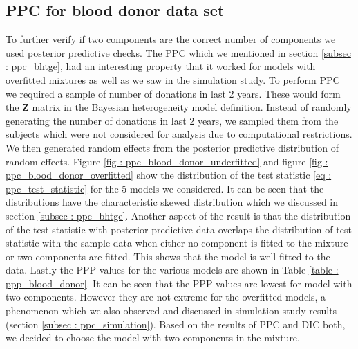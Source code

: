 \subsection{PPC for blood donor data set}
To further verify if two components are the correct number of components we used posterior predictive checks. The PPC which we mentioned in section \ref{subsec : ppc_bhtge}, had an interesting property that it worked for models with overfitted mixtures as well as we saw in the simulation study. To perform PPC we required a sample of number of donations in last 2 years. These would form the $\boldsymbol{Z}$ matrix in the Bayesian heterogeneity model definition. Instead of randomly generating the number of donations in last 2 years, we sampled them from the subjects which were not considered for analysis due to computational restrictions. We then generated random effects from the posterior predictive distribution of random effects. Figure \ref{fig : ppc_blood_donor_underfitted} and figure \ref{fig : ppc_blood_donor_overfitted} show the distribution of the test statistic \ref{eq : ppc_test_statistic} for the 5 models we considered. It can be seen that the distributions have the characteristic skewed distribution which we discussed in section \ref{subsec : ppc_bhtge}. Another aspect of the result is that the distribution of the test statistic with posterior predictive data overlaps the distribution of test statistic with the sample data when either no component is fitted to the mixture or two components are fitted. This shows that the model is well fitted to the data. Lastly the PPP values for the various models are shown in Table \ref{table : ppp_blood_donor}. It can be seen that the PPP values are lowest for model with two components. However they are not extreme for the overfitted models, a phenomenon which we also observed and discussed in simulation study results (section \ref{subsec : ppc_simulation}). Based on the results of PPC and DIC both, we decided to choose the model with two components in the mixture.

